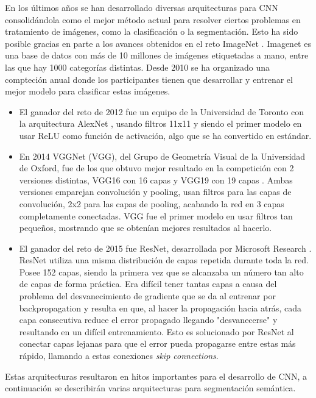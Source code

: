 En los últimos años se han desarrollado diversas arquitecturas para CNN consolidándola como el mejor método actual para resolver ciertos problemas en tratamiento de imágenes, como la clasificación o la segmentación. Esto ha sido posible gracias en parte a los avances obtenidos en el reto ImageNet \cite{Deng2009}. 
Imagenet es una base de datos con más de 10 millones de imágenes etiquetadas a mano, entre las que hay 1000 categorías distintas. Desde 2010 se ha organizado una compteción anual donde los participantes tienen que desarrollar y entrenar el mejor modelo para clasificar estas imágenes. 
\begin{itemize}
\item El ganador del reto de 2012 fue un equipo de la Universidad de Toronto con la arquitectura AlexNet \cite{Krizhevsky2012}, usando filtros 11x11 y siendo el primer modelo en usar ReLU como función de activación, algo que se ha convertido en estándar.
\item En 2014 VGGNet (VGG), del Grupo de Geometría Visual de la Universidad de Oxford, fue de los que obtuvo mejor resultado en la competición con 2 versiones distintas, VGG16 con 16 capas y VGG19 con 19 capas \cite{Simonyan2014}. Ambas versiones emparejan convolución y pooling, usan filtros para las capas de convolución, 2x2 para las capas de pooling, acabando la red en 3 capas completamente conectadas. VGG fue el primer modelo en usar filtros tan pequeños, mostrando que se obtenían mejores resultados al hacerlo.
\item El ganador del reto de 2015 fue ResNet, desarrollada por Microsoft Research \cite{He2015}. ResNet utiliza una misma distribución de capas repetida durante toda la red. Posee 152 capas, siendo la primera vez que se alcanzaba un número tan alto de capas de forma práctica. Era difícil tener tantas capas a causa del problema del desvanecimiento de gradiente \cite{Hochreiter1998} que se da al entrenar por backpropagation y resulta en que, al hacer la propagación hacia atrás, cada capa consecutiva reduce el error propagado llegando "desvanecerse" y resultando en un difícil entrenamiento. Esto es solucionado por ResNet al conectar capas lejanas para que el error pueda propagarse entre estas más rápido, llamando a estas conexiones \textit{skip connections}.
\end{itemize}

Estas arquitecturas resultaron en hitos importantes para el desarrollo de CNN, a continuación se describirán varias arquitecturas para segmentación semántica.

